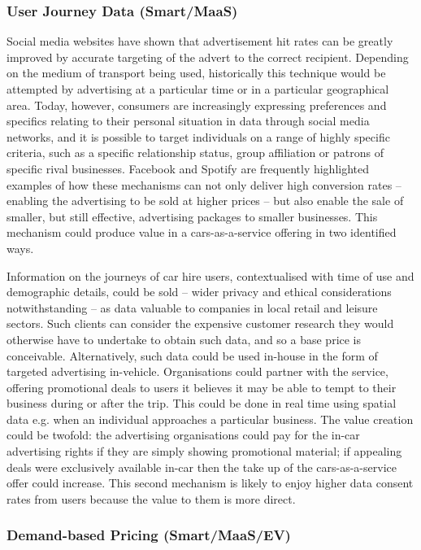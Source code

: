 \documentclass[b5paper,10pt]{article}
\begin{document}
\subsubsection{User Journey Data (Smart/MaaS)}

Social media websites have shown that advertisement hit rates can be
greatly improved by accurate targeting of the advert to the correct
recipient. Depending on the medium of transport being used,
historically this technique would be attempted by advertising at a
particular time or in a particular geographical area. Today, however,
consumers are increasingly expressing preferences and specifics
relating to their personal situation in data through social media
networks, and it is possible to target individuals on a range of
highly specific criteria, such as a specific relationship status,
group affiliation or patrons of specific rival businesses.  Facebook
and Spotify are frequently highlighted examples of how these
mechanisms can not only deliver high conversion rates -- enabling the
advertising to be sold at higher prices -- but also enable the sale of
smaller, but still effective, advertising packages to smaller
businesses. This mechanism could produce value in a cars-as-a-service
offering in two identified ways.

Information on the journeys of car hire users, contextualised with
time of use and demographic details, could be sold -- wider privacy
and ethical considerations notwithstanding -- as data valuable to
companies in local retail and leisure sectors. Such clients can
consider the expensive customer research they would otherwise have to
undertake to obtain such data, and so a base price is conceivable.
Alternatively, such data could be used in-house in the form of
targeted advertising in-vehicle. Organisations could partner with the
service, offering promotional deals to users it believes it may be
able to tempt to their business during or after the trip. This could
be done in real time using spatial data e.g. when an individual
approaches a particular business. The value creation could be twofold:
the advertising organisations could pay for the in-car advertising
rights if they are simply showing promotional material; if appealing
deals were exclusively available in-car then the take up of the
cars-as-a-service offer could increase. This second mechanism is
likely to enjoy higher data consent rates from users because the value
to them is more direct.


\subsubsection{Demand-based Pricing (Smart/MaaS/EV)}
\end{document}
